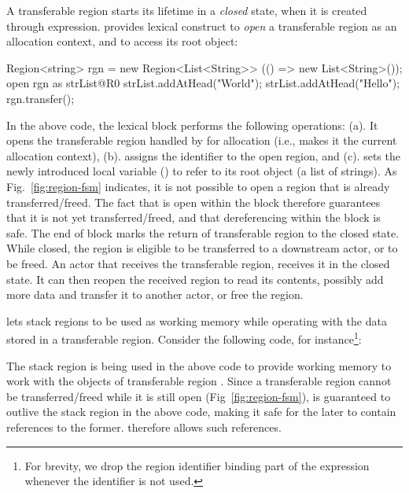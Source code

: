 A transferable region starts its lifetime in a \emph{closed} state,
when it is created through  expression. \name provides
 lexical construct to \emph{open} a transferable region as an
allocation context, and to access its root object:
\begin{codejava}
  Region<string> rgn = new Region<List<String>>
                        (() => new List<String>());
  open rgn as  strList@R0 {
    strList.addAtHead("World");
    strList.addAtHead("Hello");
  }
  rgn.transfer();
\end{codejava}
In the above code, the  lexical block performs the
following operations: (a). It opens the transferable region handled by
 for allocation (i.e., makes it the current allocation
context), (b). assigns the identifier  to the open region, and
(c). sets the newly introduced local variable () to refer
to its root object (a list of strings). As Fig.~\ref{fig:region-fsm}
indicates, it is not possible to open a region that is already
transferred/freed. The fact that  is open within the block
therefore guarantees that it is not yet transferred/freed, and that
dereferencing  within the block is safe. The end of
 block marks the return of transferable region to the closed
state.  While closed, the region is eligible to be transferred to a
downstream actor, or to be freed.  An actor that receives the
transferable region, receives it in the closed state. It can then
reopen the received region to read its contents, possibly add more
data and transfer it to another actor, or free the region. 

\name lets stack regions to be used as working memory while operating
with the data stored in a transferable region. Consider the following
code, for instance\footnote{For brevity, we drop the region identifier binding part of the
 expression whenever the identifier is not used.}:
\begin{codejava}
void onReceive(Region<List<String>> rgn)
  open rgn as strList {
    letregion R1 {
      String s = "";
      ListIterator<String> i = strList.listIterator();
      while(i.hasNext()) {
        s += i.getNext();
      }
      print s; //prints "HelloWorld"
    }
  }
  rgn.free();
}
\end{codejava}
The stack region  is being used in the above code to provide
working memory to work with the objects of transferable region
. Since a transferable region cannot be transferred/freed while
it is still open (Fig~\ref{fig:region-fsm}),  is guaranteed to
outlive the stack region  in the above code, making it safe for
the later to contain references to the former. \name therefore allows
such references.

